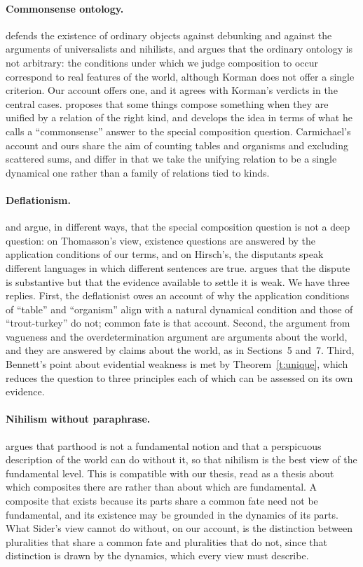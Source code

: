 \documentclass{situationist-preprint}
\begin{document}
\paragraph{Commonsense ontology.} \citet{Korman2015} defends the existence of ordinary objects against debunking and against the arguments of universalists and nihilists, and argues that the ordinary ontology is not arbitrary: the conditions under which we judge composition to occur correspond to real features of the world, although Korman does not offer a single criterion. Our account offers one, and it agrees with Korman's verdicts in the central cases. \citet{Carmichael2015} proposes that some things compose something when they are unified by a relation of the right kind, and develops the idea in terms of what he calls a \enquote{commonsense} answer to the special composition question. Carmichael's account and ours share the aim of counting tables and organisms and excluding scattered sums, and differ in that we take the unifying relation to be a single dynamical one rather than a family of relations tied to kinds.

\paragraph{Deflationism.} \citet{Thomasson2007} and \citet{Hirsch2005} argue, in different ways, that the special composition question is not a deep question: on Thomasson's view, existence questions are answered by the application conditions of our terms, and on Hirsch's, the disputants speak different languages in which different sentences are true. \citet{Bennett2009} argues that the dispute is substantive but that the evidence available to settle it is weak. We have three replies. First, the deflationist owes an account of why the application conditions of \enquote{table} and \enquote{organism} align with a natural dynamical condition and those of \enquote{trout-turkey} do not; common fate is that account. Second, the argument from vagueness and the overdetermination argument are arguments about the world, and they are answered by claims about the world, as in Sections~5 and~7. Third, Bennett's point about evidential weakness is met by Theorem~\ref{t:unique}, which reduces the question to three principles each of which can be assessed on its own evidence.

\paragraph{Nihilism without paraphrase.} \citet{Sider2013} argues that parthood is not a fundamental notion and that a perspicuous description of the world can do without it, so that nihilism is the best view of the fundamental level. This is compatible with our thesis, read as a thesis about which composites there are rather than about which are fundamental. A composite that exists because its parts share a common fate need not be fundamental, and its existence may be grounded in the dynamics of its parts. What Sider's view cannot do without, on our account, is the distinction between pluralities that share a common fate and pluralities that do not, since that distinction is drawn by the dynamics, which every view must describe.
\end{document}
